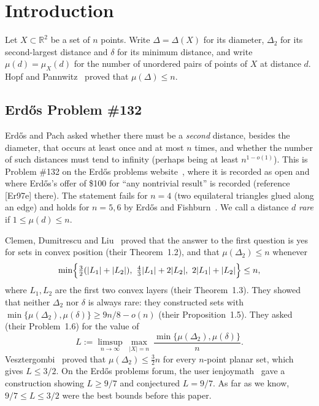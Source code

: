 \documentclass[11pt]{amsart}
\theoremstyle{definition}
\theoremstyle{remark}
\newcommand{\R}{\mathbb{R}}
\newcommand{\Dt}{\Delta_2}
\newcommand{\mult}{\mu}
\begin{document}
\section{Introduction}\label{sec:intro}

Let $X\subset\R^2$ be a set of $n$ points. Write $\Delta=\Delta(X)$ for its diameter, $\Dt$ for its second-largest distance and $\delta$ for its minimum distance, and write $\mult(d)=\mult_X(d)$ for the number of unordered pairs of points of $X$ at distance $d$. Hopf and Pannwitz~\cite{HP34} proved that $\mult(\Delta)\le n$.

\subsection*{Erd\H{o}s Problem \#132}
Erd\H{o}s and Pach asked whether there must be a \emph{second} distance, besides the diameter, that occurs at least once and at most $n$ times, and whether the number of such distances must tend to infinity (perhaps being at least $n^{1-o(1)}$). This is Problem \#132 on the Erd\H{o}s problems website~\cite{EP132}, where it is recorded as open and where Erd\H{o}s's offer of \$100 for ``any nontrivial result'' is recorded (reference [Er97e] there). The statement fails for $n=4$ (two equilateral triangles glued along an edge) and holds for $n=5,6$ by Erd\H{o}s and Fishburn~\cite{EF95a}. We call a distance $d$ \emph{rare} if $1\le\mult(d)\le n$.

Clemen, Dumitrescu and Liu~\cite{CDL25} proved that the answer to the first question is yes for sets in convex position (their Theorem~1.2), and that $\mult(\Dt)\le n$ whenever
\begin{equation}\label{eq:cdl13}
\min\Bigl\{\tfrac32(|L_1|+|L_2|),\ \tfrac43|L_1|+2|L_2|,\ 2|L_1|+|L_2|\Bigr\}\le n,
\end{equation}
where $L_1,L_2$ are the first two convex layers (their Theorem~1.3). They showed that neither $\Dt$ nor $\delta$ is always rare: they constructed sets with $\min\{\mult(\Dt),\mult(\delta)\}\ge 9n/8-o(n)$ (their Proposition~1.5). They asked (their Problem~1.6) for the value of
\[
L:=\limsup_{n\to\infty}\ \max_{|X|=n}\ \frac{\min\{\mult(\Dt),\mult(\delta)\}}{n}.
\]
Vesztergombi~\cite{Ve87} proved that $\mult(\Dt)\le\frac32 n$ for every $n$-point planar set, which gives $L\le 3/2$. On the Erd\H{o}s problems forum, the user ienjoymath~\cite{ienjoymath} gave a construction showing $L\ge 9/7$ and conjectured $L=9/7$. As far as we know, $9/7\le L\le 3/2$ were the best bounds before this paper.
\end{document}
